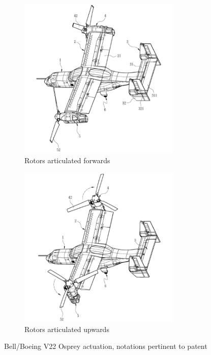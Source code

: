 \begin{figure}[htbp]
\begin{subfigure}{0.5\textwidth}
\centering
\includegraphics[width=0.85\textwidth]{figs/v22-patent-down}
\caption{Rotors articulated forwards}
\end{subfigure}
\begin{subfigure}{0.5\textwidth}
\centering
\includegraphics[width=0.85\textwidth]{figs/v22-patent-up}
\caption{Rotors articulated upwards}
\end{subfigure}
\caption{Bell/Boeing V22 Osprey actuation, notations pertinent to patent \cite{ospreypatent}}
\label{fig:osprey}
\end{figure}
